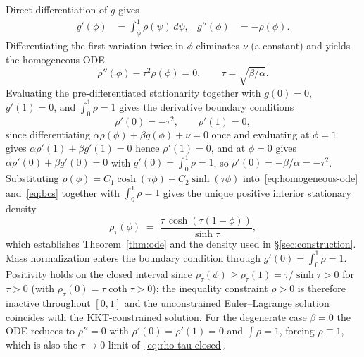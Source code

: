Direct differentiation of $g$ gives
\begin{align}
g'(\phi)
&=
\int_\phi^1 \rho(\psi)\,d\psi,
&
g''(\phi)
&=
-\rho(\phi).
\end{align}
Differentiating the first variation twice in $\phi$ eliminates $\nu$ (a constant) and yields the homogeneous ODE
\begin{equation}
\rho''(\phi) - \tau^2\rho(\phi) = 0,\qquad \tau = \sqrt{\beta/\alpha}.
\label{eq:homogeneous-ode}
\end{equation}
Evaluating the pre-differentiated stationarity together with $g(0){=}0$, $g'(1){=}0$, and $\int_0^1\rho = 1$ gives the derivative boundary conditions
\begin{equation}
\rho'(0) = -\tau^2,\qquad \rho'(1) = 0,
\label{eq:bcs}
\end{equation}
since differentiating $\alpha\rho(\phi)+\beta g(\phi)+\nu = 0$ once and evaluating at $\phi{=}1$ gives $\alpha\rho'(1)+\beta g'(1) = 0$ hence $\rho'(1){=}0$, and at $\phi{=}0$ gives $\alpha\rho'(0)+\beta g'(0) = 0$ with $g'(0) = \int_0^1\rho = 1$, so $\rho'(0) = -\beta/\alpha = -\tau^2$. Substituting $\rho(\phi) = C_1\cosh(\tau\phi)+C_2\sinh(\tau\phi)$ into~\eqref{eq:homogeneous-ode} and~\eqref{eq:bcs} together with $\int_0^1\rho = 1$ gives the unique positive interior stationary density
\begin{equation}
\rho_\tau(\phi) \;=\; \frac{\tau\,\cosh(\tau(1-\phi))}{\sinh\tau},
\label{eq:rho-tau-closed}
\end{equation}
which establishes Theorem~\ref{thm:ode} and the density used in \S\ref{sec:construction}. Mass normalization enters the
boundary condition through $g'(0)=\int_0^1\rho=1$. Positivity holds on the closed interval since $\rho_\tau(\phi){\geq}\rho_\tau(1){=}\tau/\sinh\tau{>}0$ for $\tau{>}0$ (with $\rho_\tau(0){=}\tau\coth\tau{>}0$); the inequality constraint $\rho{>}0$ is therefore inactive throughout $[0,1]$ and the unconstrained Euler--Lagrange solution coincides with the KKT-constrained solution. For the degenerate case $\beta{=}0$ the ODE reduces to $\rho''{=}0$ with $\rho'(0){=}\rho'(1){=}0$ and $\int\rho{=}1$, forcing $\rho\equiv 1$, which is also the $\tau{\to}0$ limit of~\eqref{eq:rho-tau-closed}.

